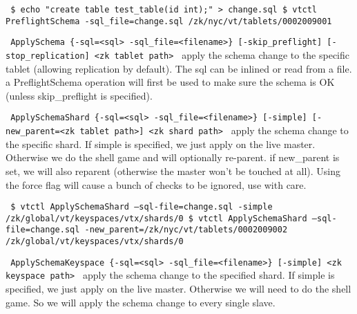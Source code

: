 {\tt 
\$ echo "create table test\_table(id int);" \textgreater{} change.sql
\$ vtctl PreflightSchema -sql\_file=change.sql /zk/nyc/vt/tablets/0002009001
}

{\tt 
ApplySchema \{-sql=\textless{}sql\textgreater{} \textbar{}\textbar{} -sql\_file=\textless{}filename\textgreater{}\} [-skip\_preflight] [-stop\_replication] \textless{}zk tablet path\textgreater{} 
}
apply the schema change to the specific tablet (allowing replication by default). The sql can be inlined or read from a file.
a PreflightSchema operation will first be used to make sure the schema is OK (unless skip\_preflight is specified).

{\tt 
ApplySchemaShard \{-sql=\textless{}sql\textgreater{} \textbar{}\textbar{} -sql\_file=\textless{}filename\textgreater{}\} [-simple] [-new\_parent=\textless{}zk tablet path\textgreater{}] \textless{}zk shard path\textgreater{}
}
apply the schema change to the specific shard. If simple is specified, we just apply on the live master. Otherwise we do the shell game and will optionally re-parent. 
if new\_parent is set, we will also reparent (otherwise the master won't be touched at all). Using the force flag will cause a bunch of checks to be ignored, use with care.

{\tt 
\$ vtctl ApplySchemaShard --sql-file=change.sql -simple /zk/global/vt/keyspaces/vtx/shards/0
\$ vtctl ApplySchemaShard --sql-file=change.sql -new\_parent=/zk/nyc/vt/tablets/0002009002 /zk/global/vt/keyspaces/vtx/shards/0
}

{\tt 
ApplySchemaKeyspace \{-sql=\textless{}sql\textgreater{} \textbar{}\textbar{} -sql\_file=\textless{}filename\textgreater{}\} [-simple] \textless{}zk keyspace path\textgreater{} 
}
apply the schema change to the specified shard. If simple is specified, we just apply on the live master. Otherwise we will need to do the shell game. So we will apply the schema change to every single slave. 

